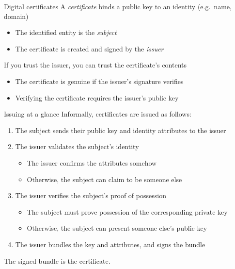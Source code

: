 \begin{frame}{Digital certificates}
  A \emph{certificate} binds a public key to an identity (e.g.\ name, domain)
  \begin{itemize}[<+(1)->]
    \item The identified entity is the \emph{subject}
    \item The certificate is created and signed by the \emph{issuer}
  \end{itemize}

  \vspace*{1em}

  \pause
  If you trust the issuer, you can trust the certificate's contents
  \begin{itemize}[<+(1)->]
    \item The certificate is genuine if the issuer's signature verifies
    \item Verifying the certificate requires the issuer's public key
  \end{itemize}
\end{frame}

\begin{frame}{Issuing at a glance}
  Informally, certificates are issued as follows:
  \begin{enumerate}[<+(1)->]
    \item The subject sends their public key and identity attributes to the issuer
    \item The issuer validates the subject's identity
    \par
    \begin{itemize}
      \item The issuer confirms the attributes somehow
      \item Otherwise, the subject can claim to be someone else
    \end{itemize}
    \item The issuer verifies the subject's proof of possession
    \par
    \begin{itemize}
      \item The subject must prove possession of the corresponding private key
      \item Otherwise, the subject can present someone else's public key
    \end{itemize}
    \item The issuer bundles the key and attributes, and signs the bundle
  \end{enumerate}

  \vspace*{0.5em}

  \pause
  The signed bundle is the certificate.
\end{frame}

